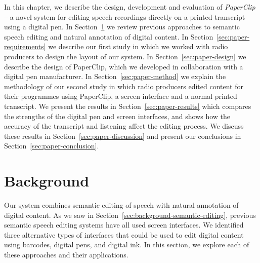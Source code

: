 
In this chapter, we describe the design, development and evaluation of \textit{PaperClip} -- a novel system for editing
speech recordings directly on a printed transcript using a digital pen.  In Section~\ref{sec:paper-background} we
review previous approaches to semantic speech editing and natural annotation of digital content. In
Section~\ref{sec:paper-requirements} we describe our first study in which we worked with radio producers to design the
layout of our system. In Section~\ref{sec:paper-design} we describe the design of PaperClip, which we developed in
collaboration with a digital pen manufacturer. In Section~\ref{sec:paper-method} we explain the methodology of our
second study in which radio producers edited content for their programmes using PaperClip, a screen interface and a
normal printed transcript.  We present the results in Section~\ref{sec:paper-results} which compares the strengths of
the digital pen and screen interfaces, and shows how the accuracy of the transcript and listening affect the editing
process.  We discuss these results in Section~\ref{sec:paper-discussion} and present our conclusions in
Section~\ref{sec:paper-conclusion}.


\section{Background}\label{sec:paper-background}


Our system combines semantic editing of speech with natural annotation of digital content. As we saw in
Section~\ref{sec:background-semantic-editing}, previous semantic speech editing systems have all used screen
interfaces. We identified three alternative types of interfaces that could be used to edit digital content using
barcodes,
digital pens,
and digital ink.
In this section, we explore each of these approaches and their applications.

